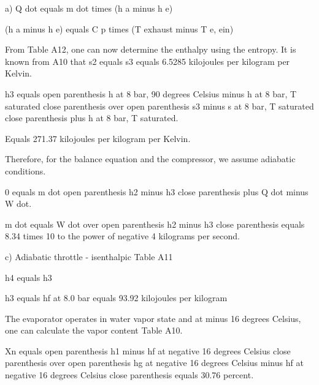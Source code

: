 a) Q dot equals m dot times (h a minus h e)

(h a minus h e) equals C p times (T exhaust minus T e, ein)

From Table A12, one can now determine the enthalpy using the entropy. It is known from A10 that s2 equals s3 equals 6.5285 kilojoules per kilogram per Kelvin.

h3 equals open parenthesis h at 8 bar, 90 degrees Celsius minus h at 8 bar, T saturated close parenthesis over open parenthesis s3 minus s at 8 bar, T saturated close parenthesis plus h at 8 bar, T saturated.

Equals 271.37 kilojoules per kilogram per Kelvin.

Therefore, for the balance equation and the compressor, we assume adiabatic conditions.

0 equals m dot open parenthesis h2 minus h3 close parenthesis plus Q dot minus W dot.

m dot equals W dot over open parenthesis h2 minus h3 close parenthesis equals 8.34 times 10 to the power of negative 4 kilograms per second.

c) Adiabatic throttle - isenthalpic Table A11

h4 equals h3

h3 equals hf at 8.0 bar equals 93.92 kilojoules per kilogram

The evaporator operates in water vapor state and at minus 16 degrees Celsius, one can calculate the vapor content Table A10.

Xn equals open parenthesis h1 minus hf at negative 16 degrees Celsius close parenthesis over open parenthesis hg at negative 16 degrees Celsius minus hf at negative 16 degrees Celsius close parenthesis equals 30.76 percent.